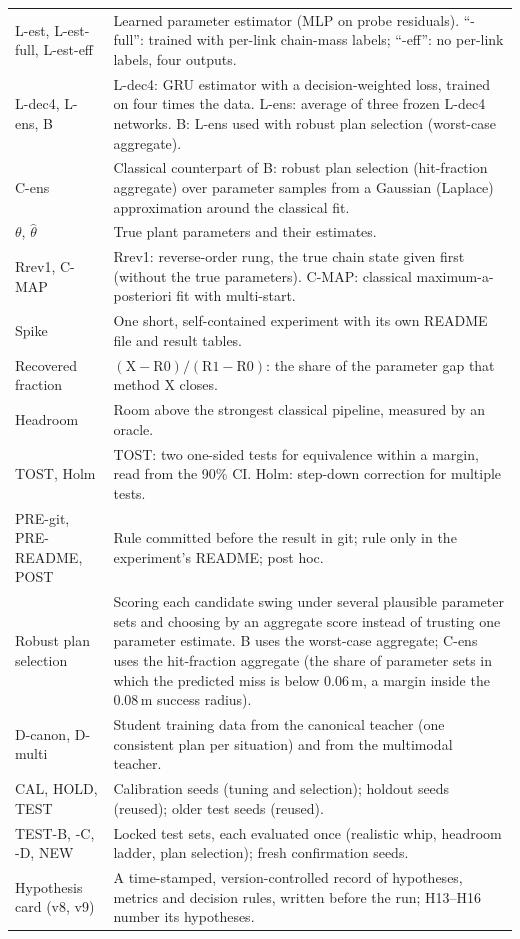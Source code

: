 \begin{table}[t]
\begin{tabular}{@{}p{2.7cm}p{14.4cm}@{}}
L-est, L-est-full, L-est-eff & Learned parameter estimator (MLP on probe residuals). ``-full'': trained with per-link chain-mass labels; ``-eff'': no per-link labels, four outputs. \\
L-dec4, L-ens, B & L-dec4: GRU estimator with a decision-weighted loss, trained on four times the data. L-ens: average of three frozen L-dec4 networks. B: L-ens used with robust plan selection (worst-case aggregate). \\
C-ens & Classical counterpart of B: robust plan selection (hit-fraction aggregate) over parameter samples from a Gaussian (Laplace) approximation around the classical fit. \\
$\theta$, $\hat\theta$ & True plant parameters and their estimates. \\
Rrev1, C-MAP & Rrev1: reverse-order rung, the true chain state given first (without the true parameters). C-MAP: classical maximum-a-posteriori fit with multi-start. \\
Spike & One short, self-contained experiment with its own README file and result tables. \\
Recovered fraction & $(\text{X}-\text{R0})/(\text{R1}-\text{R0})$: the share of the parameter gap that method X closes. \\
Headroom & Room above the strongest classical pipeline, measured by an oracle. \\
TOST, Holm & TOST: two one-sided tests for equivalence within a margin, read from the 90\% CI. Holm: step-down correction for multiple tests. \\
PRE-git, PRE-README, POST & Rule committed before the result in git; rule only in the experiment's README; post hoc. \\
Robust plan selection & Scoring each candidate swing under several plausible parameter sets and choosing by an aggregate score instead of trusting one parameter estimate. B uses the worst-case aggregate; C-ens uses the hit-fraction aggregate (the share of parameter sets in which the predicted miss is below 0.06\,m, a margin inside the 0.08\,m success radius). \\
D-canon, D-multi & Student training data from the canonical teacher (one consistent plan per situation) and from the multimodal teacher. \\
CAL, HOLD, TEST & Calibration seeds (tuning and selection); holdout seeds (reused); older test seeds (reused). \\
TEST-B, -C, -D, NEW & Locked test sets, each evaluated once (realistic whip, headroom ladder, plan selection); fresh confirmation seeds. \\
Hypothesis card (v8, v9) & A time-stamped, version-controlled record of hypotheses, metrics and decision rules, written before the run; H13--H16 number its hypotheses. \\
\bottomrule
\end{tabular}
\end{table}
